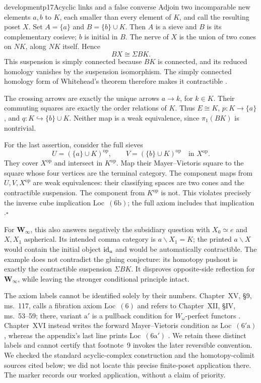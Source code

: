 \begin{dcomment}{development}{p17}{Acyclic links and a false converse}
Adjoin two incomparable new elements $a,b$ to $K$, each smaller than every element of $K$, and call the resulting poset $X$. Set $A=\{a\}$ and $B=\{b\}\cup K$. Then $A$ is a sieve and $B$ is its complementary cosieve; $b$ is initial in $B$. The nerve of $X$ is the union of two cones on $NK$, along $NK$ itself. Hence
\[
 BX\cong\Sigma BK.
\]
This suspension is simply connected because $BK$ is connected, and its reduced homology vanishes by the suspension isomorphism. The simply connected homology form of Whitehead's theorem therefore makes it contractible \citep[Corollary~4.33]{Hatcher2002}.

The crossing arrows are exactly the unique arrows $a\to k$, for $k\in K$. Their commuting squares are exactly the order relations of $K$. Thus $E\cong K$, $p:K\to\{a\}$, and $q:K\hookrightarrow\{b\}\cup K$. Neither map is a weak equivalence, since $\pi_1(BK)$ is nontrivial.

For the last assertion, consider the full sieves
\[
 U=(\{a\}\cup K)^{\mathrm{op}},\qquad
 V=(\{b\}\cup K)^{\mathrm{op}}
 \quad\text{in }X^{\mathrm{op}}.
\]
They cover $X^{\mathrm{op}}$ and intersect in $K^{\mathrm{op}}$. Map their Mayer--Vietoris square to the square whose four vertices are the terminal category. The component maps from $U,V,X^{\mathrm{op}}$ are weak equivalences: their classifying spaces are two cones and the contractible suspension. The component from $K^{\mathrm{op}}$ is not. This violates precisely the inverse cube implication Loc~$(6\mathrm b)$; the full axiom includes that implication \citep[\S3, ms.~$16'$--$17'$, footnote~13]{GrothendieckDerivateursXVI}.\hfill$\square$

For $\mathbf W_\infty$, this also answers negatively the subsidiary question with $X_0\simeq e$ and $X,X_1$ aspherical. Its intended comma category is $a\backslash X_1=K$; the printed $a\backslash X$ would contain the initial object $\mathrm{id}_a$ and would be automatically contractible. The example does not contradict the gluing conjecture: its homotopy pushout is exactly the contractible suspension $\Sigma BK$. It disproves opposite-side reflection for $\mathbf W_\infty$, while leaving the stronger conditional principle intact.

The axiom labels cannot be identified solely by their numbers. Chapter~XV, \S9, ms.~117, calls a fibration axiom Loc~$(6)$ \citep{Grothendieck1990XV} and refers to Chapter~XII, \S IV, ms.~53--59; there, variant $\mathrm a'$ is a pullback condition for $W_\omega$-perfect functors \citep{Grothendieck1990XIIa}. Chapter~XVI instead writes the forward Mayer--Vietoris condition as Loc~$(6'\mathrm a)$, whereas the appendix's last line prints Loc~$(6\mathrm a')$ \citep[\S3, ms.~$17'$]{GrothendieckDerivateursXVI}. We retain these distinct labels and cannot certify that footnote~9 invokes the later reversible convention. We checked the standard acyclic-complex construction and the homotopy-colimit sources cited below; we did not locate this precise finite-poset application there. The marker records our worked application, without a claim of priority.
\end{dcomment}


